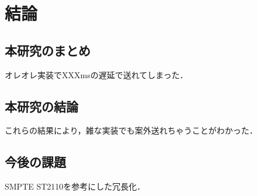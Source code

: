\chapter{結論}
\label{chap:conclusion}

\section{本研究のまとめ}
\label{section:conclusion}

オレオレ実装でXXXmsの遅延で送れてしまった．

\section{本研究の結論}

これらの結果により，雑な実装でも案外送れちゃうことがわかった．

\section{今後の課題}

SMPTE ST2110を参考にした冗長化．

